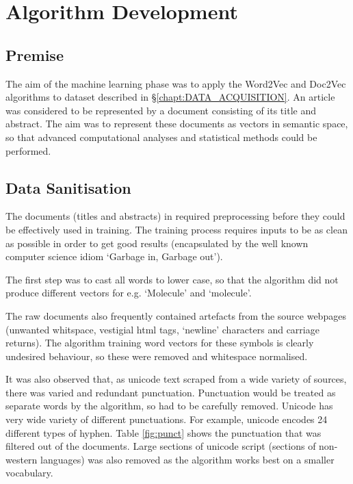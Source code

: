 \chapter{Algorithm Development}
\label{chapt:ALGORITHM}
\section{Premise}
The aim of the machine learning phase was to apply the Word2Vec and Doc2Vec algorithms to dataset  described in \S\ref{chapt:DATA_ACQUISITION}. An article was considered to be represented by a document consisting of its title and abstract. The aim was to represent these documents as vectors in semantic space, so that advanced computational analyses and statistical methods could be performed. 
\section{Data Sanitisation} 
The documents (titles and abstracts) in  required preprocessing before they could be effectively used in training. The training process requires inputs to be as clean as possible in order to get good results (encapsulated by the well known computer science idiom `Garbage in, Garbage out'). 

The first step was to cast all words to lower case, so that the algorithm did not produce different vectors for e.g.  `Molecule' and `molecule'.

The raw documents also frequently contained artefacts from the source webpages (unwanted whitspace, vestigial html tags, `newline' characters and carriage returns). The algorithm training word vectors for these symbols is clearly undesired behaviour, so these were removed and whitespace normalised.

It was also observed that, as unicode text scraped from a wide variety of sources, there was varied and redundant punctuation. Punctuation would be treated as separate words by the algorithm, so had to be carefully removed. Unicode has very wide variety of different punctuations. For example, unicode encodes 24 different types of hyphen. Table \ref{fig:punct} shows the punctuation that was filtered out of the documents. Large sections of unicode script (sections of non-western languages) was also removed as the algorithm works best on a smaller vocabulary.

